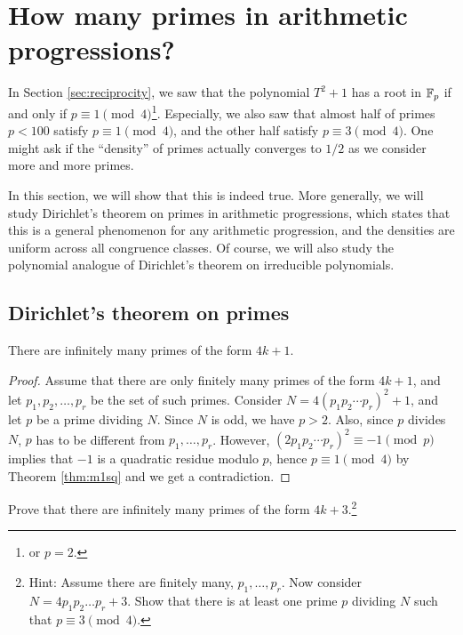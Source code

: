 \section{How many primes in arithmetic progressions?}
\label{sec:dirichlet}

In Section \ref{sec:reciprocity}, we saw that the polynomial $T^2 + 1$ has a root in $\mathbb{F}_p$ if and only if $p \equiv 1 \pmod{4}$\footnote{or $p = 2$.}.
Especially, we also saw that almost half of primes $p < 100$ satisfy $p \equiv 1 \pmod{4}$, and the other half satisfy $p \equiv 3 \pmod{4}$.
One might ask if the ``density'' of primes actually converges to $1/2$ as we consider more and more primes.

In this section, we will show that this is indeed true.
More generally, we will study Dirichlet's theorem on primes in arithmetic progressions, which states that this is a general phenomenon for any arithmetic progression, and the densities are uniform across all congruence classes.
Of course, we will also study the polynomial analogue of Dirichlet's theorem on irreducible polynomials.

\subsection{Dirichlet's theorem on primes}
\label{sec:dirichlet-primes}

\begin{theorem}
    \label{thm:1m4-prime-infinite}
    There are infinitely many primes of the form $4k + 1$.
\end{theorem}
\begin{proof}
    Assume that there are only finitely many primes of the form $4k + 1$, and let $p_1, p_2, \dots, p_r$ be the set of such primes.
    Consider $N = 4 (p_1 p_2 \cdots p_r)^2 + 1$, and let $p$ be a prime dividing $N$.
    Since $N$ is odd, we have $p > 2$.
    Also, since $p$ divides $N$, $p$ has to be different from $p_1, \dots, p_r$.
    However, $(2 p_1 p_2 \cdots p_r)^2 \equiv -1 \pmod{p}$ implies that $-1$ is a quadratic residue modulo $p$, hence $p \equiv 1 \pmod{4}$ by Theorem \ref{thm:m1sq} and we get a contradiction.
\end{proof}

\begin{exercise}
    Prove that there are infinitely many primes of the form $4k + 3$.\footnote{Hint: Assume there are finitely many, $p_1, \dots, p_r$. Now consider $N = 4p_1 p_2 \dots p_r + 3$. Show that there is at least one prime $p$ dividing $N$ such that $p \equiv 3 \pmod{4}$.}
\end{exercise}

